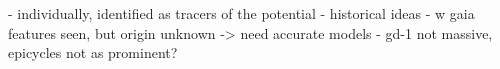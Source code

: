 \documentclass[twocolumn]{aastex63}
\begin{document}
- individually, identified as tracers of the potential
- historical ideas
- w gaia features seen, but origin unknown -> need accurate models
- gd-1 not massive, epicycles not as prominent?







% 
% 
% 
% 
\end{document}
